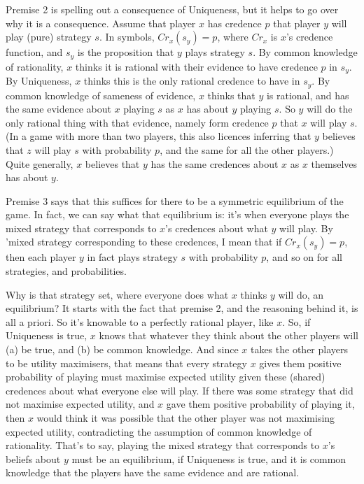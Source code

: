 \documentclass[
  11pt,
]{article}
\begin{document}
Premise 2 is spelling out a consequence of Uniqueness, but it helps to go over why it is a consequence. Assume that player \(x\) has credence \(p\) that player \(y\) will play (pure) strategy \(s\). In symbols, \(Cr_x(s_y) = p\), where \(Cr_x\) is \(x\)'s credence function, and \(s_y\) is the proposition that \(y\) plays strategy \(s\). By common knowledge of rationality, \(x\) thinks it is rational with their evidence to have credence \(p\) in \(s_y\). By Uniqueness, \(x\) thinks this is the only rational credence to have in \(s_y\). By common knowledge of sameness of evidence, \(x\) thinks that \(y\) is rational, and has the same evidence about \(x\) playing \(s\) as \(x\) has about \(y\) playing \(s\). So \(y\) will do the only rational thing with that evidence, namely form credence \(p\) that \(x\) will play \(s\). (In a game with more than two players, this also licences inferring that \(y\) believes that \(z\) will play \(s\) with probability \(p\), and the same for all the other players.) Quite generally, \(x\) believes that \(y\) has the same credences about \(x\) as \(x\) themselves has about \(y\).

Premise 3 says that this suffices for there to be a symmetric equilibrium of the game. In fact, we can say what that equilibrium is: it's when everyone plays the mixed strategy that corresponds to \(x\)'s credences about what \(y\) will play. By 'mixed strategy corresponding to these credences, I mean that if \(Cr_x(s_y) = p\), then each player \(y\) in fact plays strategy \(s\) with probability \(p\), and so on for all strategies, and probabilities.

Why is that strategy set, where everyone does what \(x\) thinks \(y\) will do, an equilibrium? It starts with the fact that premise 2, and the reasoning behind it, is all a priori. So it's knowable to a perfectly rational player, like \(x\). So, if Uniqueness is true, \(x\) knows that whatever they think about the other players will (a) be true, and (b) be common knowledge. And since \(x\) takes the other players to be utility maximisers, that means that every strategy \(x\) gives them positive probability of playing must maximise expected utility given these (shared) credences about what everyone else will play. If there was some strategy that did not maximise expected utility, and \(x\) gave them positive probability of playing it, then \(x\) would think it was possible that the other player was not maximising expected utility, contradicting the assumption of common knowledge of rationality. That's to say, playing the mixed strategy that corresponds to \(x\)'s beliefs about \(y\) must be an equilibrium, if Uniqueness is true, and it is common knowledge that the players have the same evidence and are rational.
\end{document}
